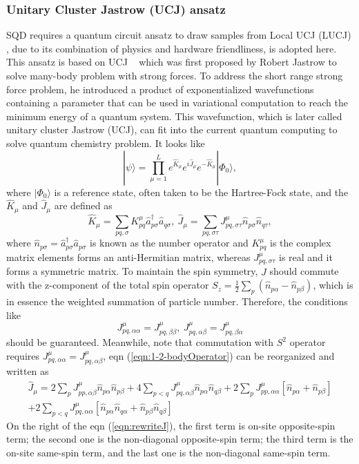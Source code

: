\subsubsection{Unitary Cluster Jastrow (UCJ) ansatz}
SQD requires a quantum circuit ansatz to draw samples from Local UCJ (LUCJ) \cite{motta2023lucj}, due to its combination of physics and hardware friendliness, is adopted here. This ansatz is based on UCJ ~\cite{Jastrow1955} which was first proposed by Robert Jastrow to solve many-body problem with strong forces. To address the short range strong force problem, he introduced a product of  exponentialized wavefunctions containing a parameter that can be used in variational computation to reach the minimum energy of a quantum system. This wavefunction, which is later called unitary cluster Jastrow (UCJ), can fit into the current quantum computing to solve quantum chemistry problem. It looks like
\begin{equation}
    |\psi\rangle=\prod_{\mu=1}^{L}e^{\hat{K}_\mu}e^{i\hat{J}_\mu}e^{-\hat{K}_\mu}|\Phi_0\rangle,
    \label{eqn:UCJ}
\end{equation}
where $|\Phi_0\rangle$ is a reference state, often taken to be the Hartree-Fock state, and the $\hat{K}_\mu$ and $\hat{J}_\mu$ are defined as \cite{ibm2024sqd,motta2023lucj}
\begin{equation}
    \hat{K}_\mu=\sum_{pq,\sigma}K^\mu_{pq}\hat{a}^\dagger_{p\sigma}\hat{a}_{q\sigma}, \: \hat{J}_\mu=\sum_{pq,\sigma\tau}J_{pq,\sigma\tau}^\mu\hat{n}_{p\sigma}\hat{n}_{q\tau},
    \label{eqn:1-2-bodyOperator}
\end{equation}
where $\hat{n}_{p\sigma}=\hat{a}^\dagger_{p\sigma}\hat{a}_{p\sigma}$ is known as the number operator and $K_{pq}^\mu$ is the complex matrix elements forms an anti-Hermitian matrix, whereas $J_{pq,\sigma\tau}^\mu$ is real and it forms a symmetric matrix. To maintain the spin symmetry, $\hat{J}$ should commute with the z-component of the total spin operator $S_z=\frac{1}{2}\sum_p(\hat{n}_{p\alpha}-\hat{n}_{p\beta})$, which is in essence the weighted summation of particle number. Therefore, the conditions like
\begin{equation}
    J_{pq,\alpha\alpha}^\mu=J_{pq,\beta\beta}^\mu, \: J_{pq,\alpha\beta}^\mu=J_{pq,\beta\alpha}^\mu
\end{equation}
should be guaranteed. Meanwhile, note that commutation with $S^2$ operator requires $J_{pq,\alpha\alpha}^\mu=J_{pq,\alpha\beta}^\mu$, eqn (\ref{eqn:1-2-bodyOperator}) can be reorganized and written as
\begin{multline}
    \hat{J}_\mu=2\sum_pJ_{pp,\alpha\beta}^\mu\hat{n}_{p\alpha}\hat{n}_{p\beta}+4\sum_{p<q}J_{pq,\alpha\beta}^\mu\hat{n}_{p\alpha}\hat{n}_{q\beta}+2\sum_pJ_{pp,\alpha\alpha}^\mu[\hat{n}_{p\alpha}+\hat{n}_{p\beta}] \\
    +2\sum_{p<q}J_{pq,\alpha\alpha}^\mu[\hat{n}_{p\alpha}\hat{n}_{q\alpha}+\hat{n}_{p\beta}\hat{n}_{q\beta}]
    \label{eqn:rewriteJ}
\end{multline}
On the right of the eqn (\ref{eqn:rewriteJ}), the first term is on-site opposite-spin term; the second one is the non-diagonal opposite-spin term; the third term is the on-site same-spin term, and the last one is the non-diagonal same-spin term.

